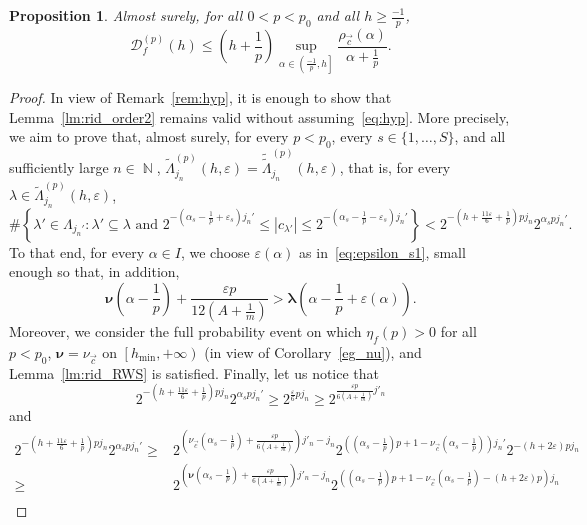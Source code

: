 \documentclass[a4paper,11pt,oneside]{article}
\DeclareMathOperator{\N}{\mathbb{N}}
\newcommand{\coint}[1]{\left[{#1}\right)}
\newcommand{\ocint}[1]{\left({#1}\right]}
\newcommand{\modu}[1]{\left\vert{#1}\right\vert}
\theoremstyle{definition}
\theoremstyle{plain}
\newtheorem{prop}[defi]{Proposition}
\begin{document}
\begin{prop}\label{upperbound_RWS}
    Almost surely, for all $0<p<p_0$ and all $h\geq\frac{-1}{p}$,
    \[
    \mathscr{D}_f^{(p)}(h) \leq \left(h+\frac{1}{p}\right)\sup_{\alpha\in\ocint{\frac{-1}{p},h}}\frac{\rho_{\vec{c}}(\alpha)}{\alpha+\frac{1}{p}}.
    \]
\end{prop}

\begin{proof}
In view of Remark~\ref{rem:hyp}, it is enough to show that
Lemma~\ref{lm:rid_order2} remains valid without assuming~\eqref{eq:hyp}.
More precisely, we aim to prove that, almost surely, for every $p<p_0$,
every $s\in\{1,\ldots,S\}$, and all sufficiently large $n\in\N$,
$\widetilde{\Lambda}_{j_n}^{(p)}(h,\varepsilon)=\widetilde{\widetilde{\Lambda}}_{j_n}^{(p)}(h,\varepsilon)$, that is, for every $\lambda\in\widetilde{\Lambda}_{j_n}^{(p)}(h,\varepsilon)$,
    \[
    \#\left\{\lambda'\in\Lambda_{j_n'}:\lambda'\subseteq\lambda  \text{ and } 2^{-\left(\alpha_s-\frac{1}{p}+\varepsilon_s\right)j_n'} \leq \modu{c_{\lambda'}} \leq 2^{-\left(\alpha_s-\frac{1}{p}-\varepsilon_s\right)j_n'}\right\}<2^{-\left(h+\frac{11\varepsilon}{6}+\frac{1}{p}\right)pj_n}2^{\alpha_spj_n'}.
    \]
    To that end, for every $\alpha\in I$, we choose $\varepsilon(\alpha)$ as in~\eqref{eq:epsilon_s1}, small enough so that, in addition,
    \[
    \bm{\nu}\left(\alpha-\frac{1}{p}\right)+\frac{\varepsilon p}{12\left(A+\frac{1}{m}\right)}>\bm{\lambda}\left(\alpha-\frac{1}{p}+\varepsilon(\alpha)\right).
    \]
    Moreover, we consider the full probability event on which $\eta_f(p)>0$ for all $p<p_0$, $\bm{\nu}=\nu_{\vec{c}}$ on $\coint{h_{\min},+\infty}$ (in view of Corollary~\ref{eg_nu}), and Lemma~\ref{lm:rid_RWS} is satisfied. 
    Finally, let us notice that 
    \[
    2^{-\left(h+\frac{11\varepsilon}{6}+\frac{1}{p}\right)pj_n}2^{\alpha_spj_n'} \geq 2^{\frac{\varepsilon}{6}pj_n} \geq 2^{\frac{\varepsilon p}{6\left(A+\frac{1}{m}\right)}j'_n}
    \]
    and
    \begin{align*}
        2^{-\left(h+\frac{11\varepsilon}{6}+\frac{1}{p}\right)pj_n}2^{\alpha_spj_n'} 
        \geq & 2^{\left(\nu_{\vec{c}}\left(\alpha_s-\frac{1}{p}\right)+\frac{\varepsilon p}{6\left(A+\frac{1}{m}\right)}\right)j'_n-j_n}2^{\left(\left(\alpha_s-\frac{1}{p}\right)p+1-\nu_{\vec{c}}\left(\alpha_s-\frac{1}{p}\right)\right)j_n'}2^{-(h+2\varepsilon)pj_n} \\
        \geq & 2^{\left(\bm{\nu}\left(\alpha_s-\frac{1}{p}\right)+\frac{\varepsilon p}{6\left(A+\frac{1}{m}\right)}\right)j'_n-j_n}2^{\left(\left(\alpha_s-\frac{1}{p}\right)p+1-\nu_{\vec{c}}\left(\alpha_s-\frac{1}{p}\right)-(h+2\varepsilon)p\right)j_n} \\

\end{align*}
\end{proof}
\end{document}
